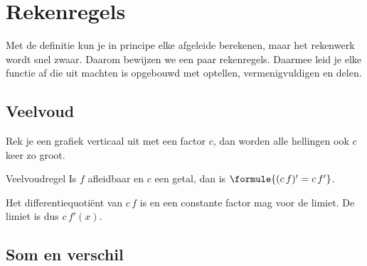 \begin{oefeningen}
\end{oefeningen}

\section{Rekenregels}\label{sec:h2-rekenregels}

Met de definitie kun je in principe elke afgeleide berekenen, maar het rekenwerk wordt snel zwaar. Daarom bewijzen we een paar rekenregels. Daarmee leid je elke functie af die uit machten is opgebouwd met optellen, vermenigvuldigen en delen.

\subsection{Veelvoud}

Rek je een grafiek verticaal uit met een factor $c$, dan worden alle hellingen ook $c$ keer zo groot.

\begin{theorie}
\begin{stelling}{Veelvoudregel}
Is $f$ afleidbaar en $c$ een getal, dan is \quad $\formule{(c\,f)' = c\,f'}$.
\end{stelling}
\begin{bewijs}
Het differentiequotiënt van $c\,f$ is
en een constante factor mag voor de limiet. De limiet is dus $c\,f'(x)$.
\end{bewijs}
\end{theorie}


\begin{oefeningen}
\end{oefeningen}

\subsection{Som en verschil}

